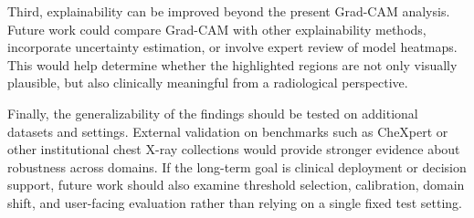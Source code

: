 Third, explainability can be improved beyond the present Grad-CAM analysis. Future work could compare Grad-CAM with other explainability methods, incorporate uncertainty estimation, or involve expert review of model heatmaps. This would help determine whether the highlighted regions are not only visually plausible, but also clinically meaningful from a radiological perspective.

Finally, the generalizability of the findings should be tested on additional datasets and settings. External validation on benchmarks such as CheXpert or other institutional chest X-ray collections would provide stronger evidence about robustness across domains. If the long-term goal is clinical deployment or decision support, future work should also examine threshold selection, calibration, domain shift, and user-facing evaluation rather than relying on a single fixed test setting.
